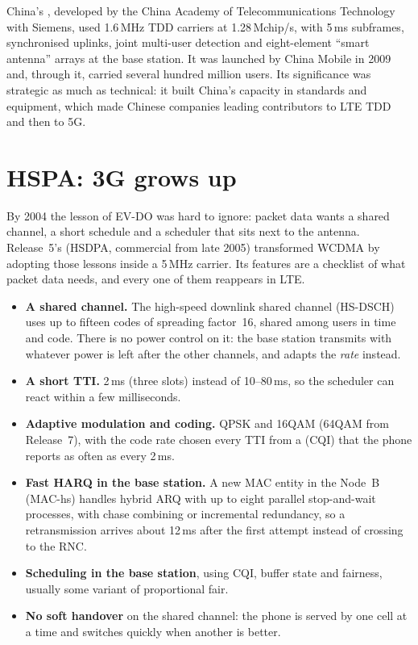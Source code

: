 China's , developed by the China Academy of Telecommunications Technology with
Siemens, used 1.6\,MHz TDD carriers at 1.28\,Mchip/s, with 5\,ms subframes, synchronised uplinks,
joint multi-user detection and eight-element ``smart antenna'' arrays at the base station. It was
launched by China Mobile in 2009 and, through it, carried several hundred million users. Its
significance was strategic as much as technical: it built China's capacity in standards and
equipment, which made Chinese companies leading contributors to LTE TDD and then to 5G.

\section{HSPA: 3G grows up}
\label{sec:ch21:hspa}

By 2004 the lesson of EV-DO was hard to ignore: packet data wants a shared channel, a short
schedule and a scheduler that sits next to the antenna. Release~5's
 (HSDPA, commercial from late 2005) transformed WCDMA by
adopting those lessons inside a 5\,MHz carrier. Its features are a checklist of what packet data
needs, and every one of them reappears in LTE.
\begin{itemize}
\item \textbf{A shared channel.} The high-speed downlink shared channel (HS-DSCH) uses up to fifteen
codes of spreading factor~16, shared among users in time and code. There is no power control on it:
the base station transmits with whatever power is left after the other channels, and adapts the
\emph{rate} instead.
\item \textbf{A short TTI.} 2\,ms (three slots) instead of 10--80\,ms, so the scheduler can react
within a few milliseconds.
\item \textbf{Adaptive modulation and coding.} QPSK and 16QAM (64QAM from Release~7), with the code
rate chosen every TTI from a  (CQI) that the phone reports as often
as every 2\,ms.
\item \textbf{Fast HARQ in the base station.} A new MAC entity in the Node~B (MAC-hs) handles hybrid
ARQ with up to eight parallel stop-and-wait processes, with chase combining or incremental
redundancy, so a retransmission arrives about 12\,ms after the first attempt instead of crossing to
the RNC.
\item \textbf{Scheduling in the base station}, using CQI, buffer state and fairness, usually some
variant of proportional fair.
\item \textbf{No soft handover} on the shared channel: the phone is served by one cell at a time and
switches quickly when another is better.
\end{itemize}

